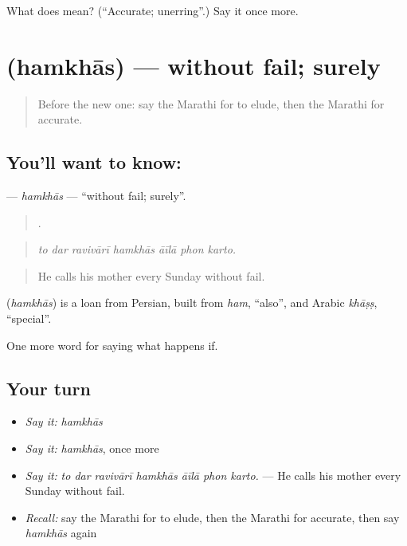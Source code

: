 \begin{tcolorbox}[breakable,colback=teal!4,colframe=teal!35!black,title={Before you move on}]
What does  mean? (\textquotedblleft{}Accurate; unerring\textquotedblright{}.) Say it once more.
\end{tcolorbox}
\section[\texorpdfstring{\mr{हमखास} (hamkhās)}{हमखास (hamkhās)}]{ (hamkhās) — without fail; surely}

\label{lesson:MR-C553-hamkhas}



\begin{quote}
Before the new one: say the Marathi for to elude, then the Marathi for accurate.
\end{quote}

\subsection*{You'll want to know: }
\textbf{} — \emph{hamkhās} — \textquotedblleft{}without fail; surely\textquotedblright{}.

\begin{quote}
      .
\end{quote}

\begin{quote}
\emph{to dar ravivārī hamkhās āīlā phon karto.}
\end{quote}

\begin{quote}
He calls his mother every Sunday without fail.
\end{quote}

\begin{cousinweb}
\textbf{} (\emph{hamkhās}) is a loan from Persian, built from \emph{ham}, \textquotedblleft{}also\textquotedblright{}, and Arabic \emph{khāṣṣ}, \textquotedblleft{}special\textquotedblright{}.
\end{cousinweb}

\begin{grammarlens}[title={What you've built}]
One more word for saying what happens if.
\end{grammarlens}

\subsection*{Your turn}
\begin{itemize}
\raggedright
  \item \emph{Say it:} \emph{hamkhās}
  \item \emph{Say it:} \emph{hamkhās}, once more
  \item \emph{Say it:} \emph{to dar ravivārī hamkhās āīlā phon karto.} — He calls his mother every Sunday without fail.
  \item \emph{Recall:} say the Marathi for to elude, then the Marathi for accurate, then say \emph{hamkhās} again
\end{itemize}

